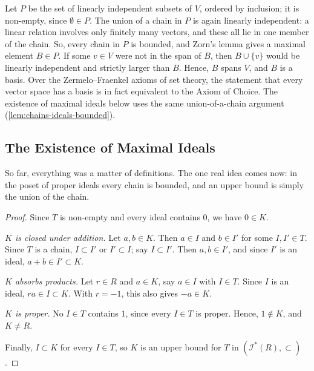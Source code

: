 \begin{beyond}
Let $P$ be the set of linearly independent subsets of $V$, ordered by inclusion; it is non-empty, since $\emptyset \in P$. The union of a chain in $P$ is again linearly independent: a linear relation involves only finitely many vectors, and these all lie in one member of the chain. So, every chain in $P$ is bounded, and Zorn's lemma gives a maximal element $B \in P$. If some $v \in V$ were not in the span of $B$, then $B \cup \{v\}$ would be linearly independent and strictly larger than $B$. Hence, $B$ spans $V$, and $B$ is a basis. Over the Zermelo--Fraenkel axioms of set theory, the statement that every vector space has a basis is in fact equivalent to the Axiom of Choice. The existence of maximal ideals below uses the same union-of-a-chain argument (\cref{lem:chains-ideals-bounded}).
\end{beyond}

\subsection{The Existence of Maximal Ideals}

So far, everything was a matter of definitions. The one real idea comes now: in the poset of proper ideals every chain is bounded, and an upper bound is simply the union of the chain.


\begin{proof}
Since $T$ is non-empty and every ideal contains $0$, we have $0 \in K$.

\emph{$K$ is closed under addition.} Let $a, b \in K$. Then $a \in I$ and $b \in I'$ for some $I, I' \in T$. Since $T$ is a chain, $I \subset I'$ or $I' \subset I$; say $I \subset I'$. Then $a, b \in I'$, and since $I'$ is an ideal, $a + b \in I' \subset K$.

\emph{$K$ absorbs products.} Let $r \in R$ and $a \in K$, say $a \in I$ with $I \in T$. Since $I$ is an ideal, $r a \in I \subset K$. With $r = -1$, this also gives $-a \in K$.

\emph{$K$ is proper.} No $I \in T$ contains $1$, since every $I \in T$ is proper. Hence, $1 \notin K$, and $K \neq R$.

Finally, $I \subset K$ for every $I \in T$, so $K$ is an upper bound for $T$ in $(\mathscr{I}^*(R), \subset)$.
\end{proof}

